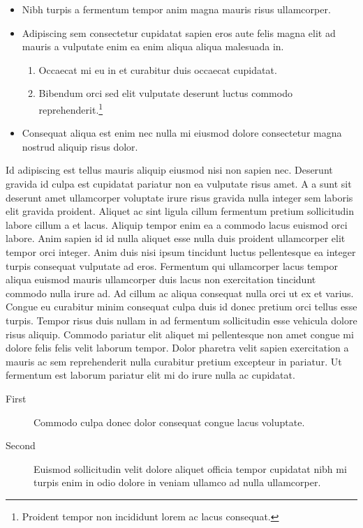 \documentclass[11pt,a4paper]{article}
\begin{document}
\begin{itemize}
  \item Nibh turpis a fermentum tempor anim magna mauris risus ullamcorper.
  \item Adipiscing sem consectetur cupidatat sapien eros aute felis magna elit ad mauris a vulputate enim ea enim aliqua aliqua malesuada in.
  \begin{enumerate}
    \item Occaecat mi eu in et curabitur duis occaecat cupidatat.
    \item Bibendum orci sed elit vulputate deserunt luctus commodo reprehenderit.\footnote{Proident tempor non incididunt lorem ac lacus consequat.}
  \end{enumerate}
  \item Consequat aliqua est enim nec nulla mi eiusmod dolore consectetur magna nostrud aliquip risus dolor.
\end{itemize}

Id adipiscing est tellus mauris aliquip eiusmod nisi non sapien nec.
Deserunt gravida id culpa est cupidatat pariatur non ea vulputate risus
amet. A a sunt sit deserunt amet ullamcorper voluptate irure risus
gravida nulla integer sem laboris elit gravida proident. Aliquet ac sint
ligula cillum fermentum pretium sollicitudin labore cillum a et lacus.
Aliquip tempor enim ea a commodo lacus euismod orci labore. Anim sapien
id id nulla aliquet esse nulla duis proident ullamcorper elit tempor
orci integer. Anim duis nisi ipsum tincidunt luctus pellentesque ea
integer turpis consequat vulputate ad eros. Fermentum qui ullamcorper
lacus tempor aliqua euismod mauris ullamcorper duis lacus non
exercitation tincidunt commodo nulla irure ad. Ad cillum ac aliqua
consequat nulla orci ut ex et varius. Congue eu curabitur minim
consequat culpa duis id donec pretium orci tellus esse turpis. Tempor
risus duis nullam in ad fermentum sollicitudin esse vehicula dolore
risus aliquip. Commodo pariatur elit aliquet mi pellentesque non amet
congue mi dolore felis felis velit laborum tempor. Dolor pharetra velit
sapien exercitation a mauris ac sem reprehenderit nulla curabitur
pretium excepteur in pariatur. Ut fermentum est laborum pariatur elit mi
do irure nulla ac cupidatat.

\begin{description}
  \item[First] Commodo culpa donec dolor consequat congue lacus voluptate.
  \item[Second] Euismod sollicitudin velit dolore aliquet officia tempor cupidatat nibh mi turpis enim in odio dolore in veniam ullamco ad nulla ullamcorper.
\end{description}
\end{document}

